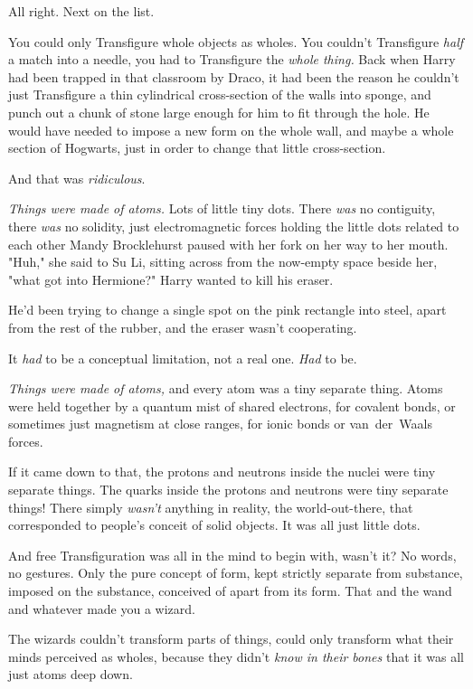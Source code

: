 All right. Next on the list.

You could only Transfigure whole objects as wholes. You couldn't Transfigure
\emph{half} a match into a needle, you had to Transfigure the \emph{whole
thing.} Back when Harry had been trapped in that classroom by Draco, it had
been the reason he couldn't just Transfigure a thin cylindrical cross-section
of the walls into sponge, and punch out a chunk of stone large enough for him
to fit through the hole. He would have needed to impose a new form on the whole
wall, and maybe a whole section of Hogwarts, just in order to change that
little cross-section.

And that was \emph{ridiculous}.

\emph{Things were made of atoms.} Lots of little tiny dots. There \emph{was} no
contiguity, there \emph{was} no solidity, just electromagnetic forces holding
the little dots related to each other{\el}
\sbreak
Mandy Brocklehurst paused with her fork on her way to her mouth. "Huh," she
said to Su Li, sitting across from the now-empty space beside her, "what got
into Hermione?"
\sbreak
Harry wanted to kill his eraser.

He'd been trying to change a single spot on the pink rectangle into steel,
apart from the rest of the rubber, and the eraser wasn't cooperating.

It \emph{had} to be a conceptual limitation, not a real one. \emph{Had} to be.

\emph{Things were made of atoms,} and every atom was a tiny separate thing.
Atoms were held together by a quantum mist of shared electrons, for covalent
bonds, or sometimes just magnetism at close ranges, for ionic bonds or
van~der~Waals forces.

If it came down to that, the protons and neutrons inside the nuclei were tiny
separate things. The quarks inside the protons and neutrons were tiny separate
things! There simply \emph{wasn't} anything in reality, the world-out-there,
that corresponded to people's conceit of solid objects. It was all just little
dots.

And free Transfiguration was all in the mind to begin with, wasn't it? No
words, no gestures. Only the pure concept of form, kept strictly separate from
substance, imposed on the substance, conceived of apart from its form. That and
the wand and whatever made you a wizard.

The wizards couldn't transform parts of things, could only transform what their
minds perceived as wholes, because they didn't \emph{know in their bones} that
it was all just atoms deep down.

